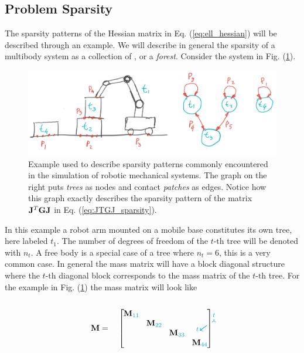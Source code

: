 \subsection{Problem Sparsity}

The sparsity patterns of the Hessian matrix in Eq. (\ref{eq:ell_hessian}) will
be described through an example. We will describe in general the sparsity of a
multibody system as a collection of , or a
\textit{forest}. Consider the system in Fig. (\ref{fig:sparsity_example}).
\begin{figure}[!h]
	\centering
	\includegraphics[width=0.7\columnwidth]{figures/sparsity_example.png}
	\caption{\label{fig:sparsity_example} 
	Example used to describe sparsity patterns commonly encountered in the
	simulation of robotic mechanical systems. The graph on the right puts
	\textit{trees} as nodes and contact \textit{patches} as edges. Notice how
	this graph exactly describes the sparsity pattern of the matrix
	${\mathbf{J}}^T{\mathbf{G}}{\mathbf{J}}$ in Eq. (\ref{eq:JTGJ_sparsity}).}
\end{figure}
In this example a robot arm mounted on a mobile base constitutes its own tree,
here labeled $t_1$. The number of degrees of freedom of the $t\text{-th}$ tree
will be denoted with $n_t$. A free body is a special case of a tree where
$n_t=6$, this is a very common case. In general the mass matrix will have a
block diagonal structure where the $t\text{-th}$ diagonal block corresponds to
the mass matrix of the $t\text{-th}$ tree. For the example in Fig.
(\ref{fig:sparsity_example}) the mass matrix will look like\\\\
\begin{equation}
	\mf{M}=\quad
	\begin{bmatrix}
		\tikzmark{M_topleft}
		\diagentry{\mf{M}_{\cc{11}}}&&&\tikzmark{M_topright}\\
		&\diagentry{\mf{M}_{\cc{22}}}\\
		&&\diagentry{\mf{M}_{\cc{33}}}\\		
		\tikzmark{M_bottomleft}&&&\diagentry{\mf{M}_{\cc{44}}}
	\end{bmatrix}
\tikz[overlay,remember picture] {
	\draw[->,thick,color=cyan]
  ([yshift=3ex]M_topleft) -- ([yshift=3ex]M_topright) node[midway,above]
  {\scriptsize $t$}; 
  \draw[->,thick,color=cyan]
  ([yshift=1.5ex,xshift=-2ex]M_topleft) -- ([xshift=-4ex]M_bottomleft)
  node[near end,left] {\scriptsize $t$};}	
\end{equation}

